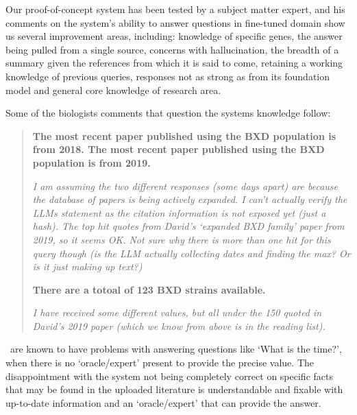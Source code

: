 Our proof-of-concept system has been tested by a subject matter expert, and his comments on the system's ability to answer questions in fine-tuned domain show us several improvement areas, including: knowledge of specific genes, the answer being pulled from a single source, concerns with hallucination, the breadth of a summary given the references from which it is said to come, retaining a working knowledge of previous queries, responses not as strong as from its foundation model and general core knowledge of research area.

Some of the biologists comments that question the systems knowledge follow: 
\begin{quotation}

\textbf{The most recent paper published using the BXD population is from 2018. The most recent paper published using the BXD population is from 2019.} 

\textit{I am assuming the two different responses (some days apart) are because the database of papers is being actively expanded. I can’t actually verify the LLMs statement as the citation information is not exposed yet (just a hash). The top hit quotes from David’s ‘expanded BXD family’ paper from 2019, so it seems OK. Not sure why there is more than one hit for this query though (is the LLM actually collecting dates and finding the max? Or is it just making up text?)}


\textbf{There are a totoal of 123 BXD strains available.} 

\textit{I have received some different values, but all under the 150 quoted in David's 2019 paper (which we know from above is in the reading list).}
\end{quotation}

\llms\ are known to have problems with answering questions like `What is the time?', when there is no `oracle/expert' present to provide the precise value.
The disappointment with the system not being completely correct on specific facts that may be found in the uploaded literature is understandable and fixable with up-to-date information and an `oracle/expert' that can provide the answer.

